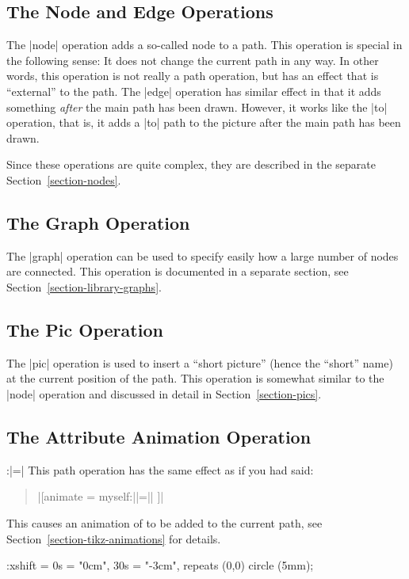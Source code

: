 \subsection{The Node and Edge Operations}

The |node| operation adds a so-called node to a path. This operation is special
in the following sense: It does not change the current path in any way. In
other words, this operation is not really a path operation, but has an effect
that is ``external'' to the path. The |edge| operation has similar effect in
that it adds something \emph{after} the main path has been drawn. However, it
works like the |to| operation, that is, it adds a |to| path to the picture
after the main path has been drawn.

Since these operations are quite complex, they are described in the separate
Section~\ref{section-nodes}.


\subsection{The Graph Operation}

The |graph| operation can be used to specify easily how a large number of nodes
are connected. This operation is documented in a separate section, see
Section~\ref{section-library-graphs}.


\subsection{The Pic Operation}

The |pic| operation is used to insert a ``short picture'' (hence the ``short''
name) at the current position of the path. This operation is somewhat similar
to the |node| operation and discussed in detail in Section~\ref{section-pics}.


\subsection{The Attribute Animation Operation}

\begin{pathoperation}{:}{|=|}
    This path operation has the same effect as if you had said:
    \begin{quote}
        |[animate = { myself:||=||} ]|
    \end{quote}
    This causes an animation of  to be added to the
    current path, see Section~\ref{section-tikz-animations} for details.
\begin{codeexample}[width=2cm]
\tikz \draw :xshift = {0s = "0cm", 30s = "-3cm", repeats} (0,0) circle (5mm);
\end{codeexample}
\end{pathoperation}


